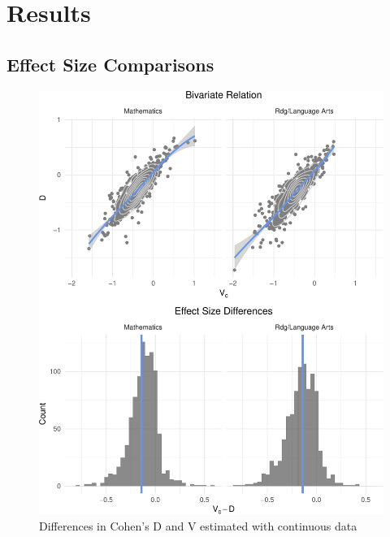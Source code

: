 \documentclass[man, fleqn, noextraspace]{apa6}
\theoremstyle{definition}
\theoremstyle{definition}
\theoremstyle{definition}
\theoremstyle{remark}
\begin{document}
\hypertarget{results}{%
\section{Results}\label{results}}

\hypertarget{effect-size-comparisons}{%
\subsection{Effect Size Comparisons}\label{effect-size-comparisons}}

\begin{figure}
\centering
\includegraphics{anderson_ncme18_files/figure-latex/unnamed-chunk-1-1.pdf}
\caption{\label{fig:unnamed-chunk-1}Differences in Cohen's D and V estimated
with continuous data}
\end{figure}
\end{document}
